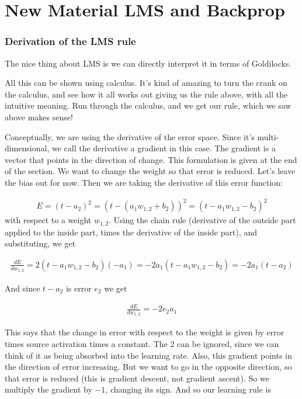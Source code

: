 \chapter{New Material LMS and Backprop}

\subsection{Derivation of the LMS rule}

The nice thing about LMS is we can directly interpret it in terms of Goldilocks.

All this can be shown using calculus. It's kind of amazing to turn the crank on the calculus, and see how it all works out giving us the rule above, with all the intuitive meaning. Run through the calculus, and we get our rule, which we saw above makes sense!

Conceptually, we are using the derivative of the error space. Since it's multi-dimensional, we call the derivative a gradient in this case. The gradient is a vector that points in the direction of change. This formulation is given at the end of the section. We want to change the weight so that error is reduced. Let's leave the bias out for now. Then we are taking the  derivative of this error function:

\begin{eqnarray*}
E = (t - a_2)^2  =  (t - ( a_1 w_{1,2} + b_2))^2  =  (t -  a_1 w_{1,2} -  b_2)^2 
\end{eqnarray*}
with respect to a weight $w_{1,2}$.  Using the chain rule (derivative of the outside part applied to the inside part, times the derivative of the inside part), and substituting, we get

\begin{eqnarray*}
\frac{dE}{dw_{1,2}} = 2 (t - a_1 w_{1,2} - b_2) (-a_1) =  -2 a_1 (t - a_1 w_{1,2} - b_2) =  -2 a_1 (t - a_2)
\end{eqnarray*}

And since $t -  a_2$ is error $e_2$ we get

\begin{eqnarray*}
\frac{dE}{dw_{1,2}} = -2 e_2 a_1
\end{eqnarray*}

This says that the change in error with respect to the weight is given by error times source activation times a constant. The 2 can be ignored, since we can think of it as being absorbed into the learning rate. Also, this gradient points in the direction of error increasing. But we want to go in the opposite direction, so that error is reduced (this is gradient descent, not gradient ascent). So we multiply the gradient by $-1$, changing its sign. And so our learning rule is 

